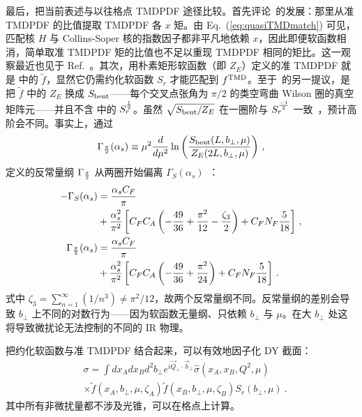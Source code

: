 最后，把当前表述与以往格点 TMDPDF 途径比较。首先评论~\cite{Hagler:2009mb,Musch:2010ka,Musch:2011er,Engelhardt:2015xja,Yoon:2017qzo}的发展：那里从准 TMDPDF 的比值提取 TMDPDF 各 $x$ 矩。由 Eq.~(\ref{eq:quasiTMDmatch}) 可见，匹配核 $H$ 与 Collins-Soper 核的指数因子都非平凡地依赖 $x$，因此即便软函数相消，简单取准 TMDPDF 矩的比值也不足以重现 TMDPDF 相同的矩比。这一观察最近也见于 Ref.~\cite{Ebert:2020gxr}。其次，用朴素矩形软函数（即 $Z_E$）定义的准 TMDPDF 就是  中的 $\tilde f$，显然它仍需约化软函数 $S_r$ 才能匹配到 $f^{\rm TMD}$。至于~\cite{Ji:2014hxa,Ebert:2019okf}的另一提议，是把 $\tilde f$ 中的 $Z_E$ 换成 $S_{\rm bent}$——每个交叉点张角为 $\pi/2$ 的类空弯曲 Wilson 圈的真空矩阵元——并且不含  中的 $S^{1\over2}_r$。虽然 $\sqrt{S_{\rm bent}/Z_E}$ 在一圈阶与 $S_r^{-1\over2}$ 一致~\cite{Ji:2018hvs,Ebert:2019okf}，预计高阶会不同。事实上，通过
\begin{align}
	\Gamma_{\frac{\pi}{2}}(\alpha_s) \equiv \mu^2\frac{d}{d\mu^2} \ln \left(\frac{S_{\rm bent}(L,b_\perp,\mu)}{Z_E(2L,b_\perp,\mu)}\right) \,,
\end{align}
定义的反常量纲 $\Gamma_{\pi\over2}$ 从两圈开始偏离 $\Gamma_S(\alpha_s)$~\cite{Grozin:2015kna}：
\begin{align}
	-\Gamma_S(\alpha_s)&=\frac{\alpha_sC_F}{\pi} \\
	&+\frac{\alpha_s^2}{\pi^2}\left[C_FC_A\left(-\frac{49}{36}+\frac{\pi^2}{12}-\frac{\zeta_3}{2}\right)+C_FN_F\frac{5}{18}\right]  \,, \nonumber \\
	\Gamma_{\frac{\pi}{2}}(\alpha_s)&=\frac{\alpha_sC_F}{\pi} \\
	&+\frac{\alpha_s^2}{\pi^2}\left[C_FC_A\left(-\frac{49}{36}+\frac{\pi^2}{24}\right)+C_FN_F\frac{5}{18}\right] \,. \nonumber
\end{align}
式中 $\zeta_3=\sum_{n=1}^{\infty}(1/n^3) \ne \pi^2/12$，故两个反常量纲不同。反常量纲的差别会导致 $b_\perp$ 上不同的对数行为——因为软函数无量纲、只依赖 $b_\perp$ 与 $\mu$。在大 $b_\perp$ 处这将导致微扰论无法控制的不同的 IR 物理。

把约化软函数与准 TMDPDF 结合起来，可以有效地因子化 DY 截面：
\begin{align}
	&\sigma = \int dx_A dx_B d^2b_\perp e^{i\vec{Q}_\perp \cdot \vec{b}_\perp}\hat \sigma(x_A,x_B,Q^2,\mu)\nonumber \\ &\times \tilde f(x_A,b_\perp,\mu,\zeta_A) \tilde f(x_B,b_\perp,\mu,\zeta_B) S_r(b_\perp,\mu) \ .
\end{align}
其中所有非微扰量都不涉及光锥，可以在格点上计算。

